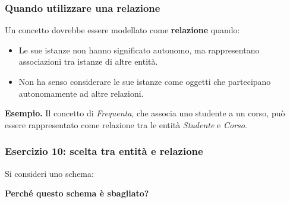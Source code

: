 \subsubsection*{Quando utilizzare una relazione}

Un concetto dovrebbe essere modellato come
\textbf{relazione} quando:

\begin{itemize}
    \item Le sue istanze non hanno significato autonomo,
    ma rappresentano associazioni tra istanze
    di altre entità.

    \item Non ha senso considerare le sue istanze
    come oggetti che partecipano autonomamente
    ad altre relazioni.
\end{itemize}
\noindent
\textcolor{verdeEsempio}{\textbf{Esempio.}}
Il concetto di \textit{Frequenta}, che associa
uno studente a un corso, può essere rappresentato
come relazione tra le entità \textit{Studente}
e \textit{Corso}.

\subsubsection*{Esercizio 10: scelta tra entità e relazione}

Si consideri uno schema:
\begin{center}
\end{center}
\noindent
\textbf{Perché questo schema è sbagliato?}

